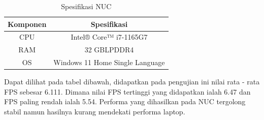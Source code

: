 \begin{longtable}{|c|c|}
    \caption{Spesifikasi NUC}
    \label{tb:Spesifikasi NUC}                             \\
    \hline   
    \rowcolor[HTML]{C0C0C0}
    \textbf{Komponen} & \textbf{Spesifikasi} \\
    \hline
  CPU            &  Intel® Core™ i7-1165G7        \\
  RAM            & 32 GBLPDDR4        \\
  OS            & Windows 11 Home Single Language           \\
\end{longtable}
Dapat dilihat pada tabel dibawah, didapatkan pada pengujian ini nilai rata - rata FPS sebesar 6.111. Dimana nilai FPS tertinggi yang didapatkan ialah 6.47 dan FPS paling rendah ialah 5.54. Performa yang dihasilkan pada NUC tergolong stabil namun hasilnya kurang mendekati performa laptop.

